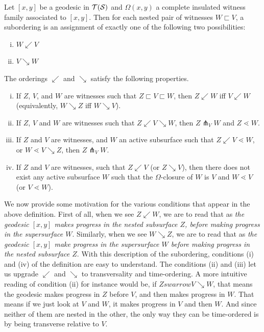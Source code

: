 \documentclass[12pt, reqno]{amsart}
\begin{document}
  \begin{definition}[Subordering]
    Let $[x,y]$ be a geodesic in $\mathcal{T}(\mathcal{S})$ and $\Omega(x,y)$ a complete insulated witness family associated to $[x,y]$.
    Then for each nested pair of witnesses $W \sqsubset V$, a subordering is an assignment of exactly one of the following two possibilities:
    \begin{enumerate}[(i)]
    \item $W \swarrow V$
    \item $V \searrow W$
    \end{enumerate}
    The orderings $\swarrow$ and $\searrow$ satisfy the following properties.
    \begin{enumerate}[(i)]
    \item If $Z$, $V$, and $W$ are witnesses such that $Z \sqsubset V \sqsubset W$, then $Z \swarrow W$ iff $V \swarrow W$ (equivalently, $W \searrow Z$ iff $W \searrow V$).
    \item If $Z$, $V$ and $W$ are witnesses such that $Z \swarrow V \searrow W$, then $Z \pitchfork_V W$ and $Z \lessdot W$. 
    \item If $Z$ and $V$ are witnesses, and $W$ an active subsurface such that $Z \swarrow V \lessdot W$, or $W \lessdot V \searrow Z$, then $Z \pitchfork_V W$.
    \item If $Z$ and $V$ are witnesses, such that $Z \swarrow V$ (or $Z \searrow V$), then there does not exist any active subsurface $W$ such that the $\Omega$-closure of $W$ is $V$ and $W \lessdot V$ (or $V \lessdot W$).
    \end{enumerate}
  \end{definition}

  We now provide some motivation for the various conditions that appear in the above definition.
  First of all, when we see $Z \swarrow W$, we are to read that as \emph{the geodesic $[x,y]$ makes progress in the nested subsurface $Z$, before making progress in the supersurface $W$}.
  Similarly, when we see $W \searrow Z$, we are to read that as \emph{the geodesic $[x,y]$ make progress in the supersurface $W$ before making progress in the nested subsurface $Z$}.
  With this description of the subordering, conditions (i) and (iv) of the definition are easy to understand. The conditions (ii) and (iii) let us upgrade $\swarrow$ and $\searrow$ to transversality and time-ordering.
  A more intuitive reading of condition (ii) for instance would be, if $Z swarrow V \searrow W$, that means the geodesic makes progress in $Z$ before $V$, and then makes progress in $W$.
  That means if we just look at $V$ and $W$, it makes progress in $V$ and then $W$. And since neither of them are nested in the other, the only way they can be time-ordered is by being transverse relative to $V$.
\end{document}
